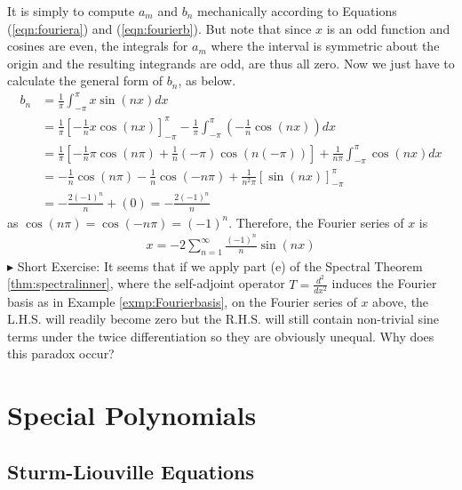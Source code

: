 \begin{solution}
It is simply to compute $a_m$ and $b_n$ mechanically according to Equations (\ref{eqn:fouriera}) and (\ref{eqn:fourierb}). But note that since $x$ is an odd function and cosines are even, the integrals for $a_m$ where the interval is symmetric about the origin and the resulting integrands are odd, are thus all zero. Now we just have to calculate the general form of $b_n$, as below.
\begin{align*}
b_n &= \frac{1}{\pi} \int_{-\pi}^{\pi} x\sin(nx) dx \\
&= \frac{1}{\pi}[-\frac{1}{n}x\cos(nx)]_{-\pi}^{\pi} - \frac{1}{\pi}\int_{-\pi}^{\pi} (-\frac{1}{n}\cos(nx)) dx \\
&= \frac{1}{\pi}[-\frac{1}{n}\pi\cos(n\pi) + \frac{1}{n}(-\pi)\cos(n(-\pi))] + \frac{1}{n\pi}\int_{-\pi}^{\pi} \cos(nx) dx \\
&= -\frac{1}{n}\cos(n\pi) - \frac{1}{n}\cos(-n\pi) + \frac{1}{n^2\pi}[\sin(nx)]_{-\pi}^{\pi} \\
&= -\frac{2(-1)^n}{n} + (0) = -\frac{2(-1)^n}{n}
\end{align*}
as $\cos(n\pi) = \cos(-n\pi) = (-1)^n$. Therefore, the Fourier series of $x$ is
\begin{align*}
x = -2 \sum_{n=1}^{\infty} \frac{(-1)^n}{n} \sin(nx)
\end{align*}
$\blacktriangleright$ Short Exercise: It seems that if we apply part (e) of the Spectral Theorem \ref{thm:spectralinner}, where the self-adjoint operator $T = \frac{d^2}{dx^2}$ induces the Fourier basis as in Example \ref{exmp:Fourierbasis}, on the Fourier series of $x$ above, the L.H.S. will readily become zero but the R.H.S. will still contain non-trivial sine terms under the twice differentiation so they are obviously unequal. Why does this paradox occur?\footnotemark
\end{solution}

\section{Special Polynomials}

\subsection{Sturm-Liouville Equations}

